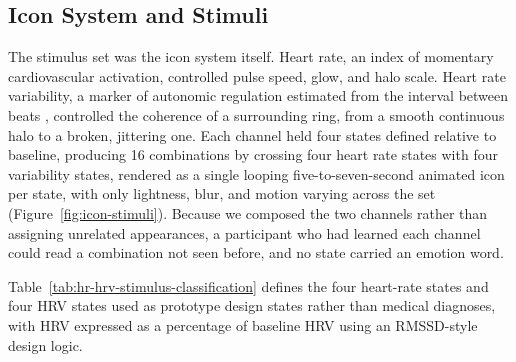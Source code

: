 \documentclass[manuscript,review,anonymous]{acmart}
\begin{document}
\subsection{Icon System and Stimuli}
The stimulus set was the icon system itself. Heart rate, an index of momentary cardiovascular activation, controlled pulse speed, glow, and halo scale. Heart rate variability, a marker of autonomic regulation estimated from the interval between beats \cite{thayer_model_2000, porges_polyvagal_2007, shaffer_overview_2017}, controlled the coherence of a surrounding ring, from a smooth continuous halo to a broken, jittering one. Each channel held four states defined relative to baseline, producing 16 combinations by crossing four heart rate states with four variability states, rendered as a single looping five-to-seven-second animated icon per state, with only lightness, blur, and motion varying across the set (Figure~\ref{fig:icon-stimuli}). Because we composed the two channels rather than assigning unrelated appearances, a participant who had learned each channel could read a combination not seen before, and no state carried an emotion word.

Table~\ref{tab:hr-hrv-stimulus-classification} defines the four heart-rate states and four HRV states used as prototype design states rather than medical diagnoses, with HRV expressed as a percentage of baseline HRV using an RMSSD-style design logic.
\end{document}
